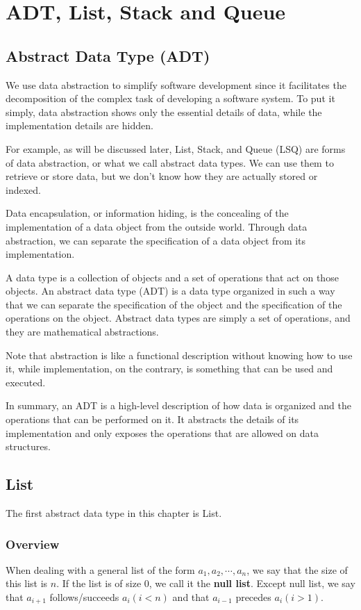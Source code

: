 \chapter{ADT, List, Stack and Queue}

\section{Abstract Data Type (ADT)}
We use data abstraction to simplify software development since it facilitates the decomposition of the complex task of developing a software system. To put it simply, data abstraction shows only the essential details of data, while the implementation details are hidden.

For example, as will be discussed later, List, Stack, and Queue (LSQ) are forms of data abstraction, or what we call abstract data types. We can use them to retrieve or store data, but we don't know how they are actually stored or indexed.

Data encapsulation, or information hiding, is the concealing of the implementation of a data object from the outside world. Through data abstraction, we can separate the specification of a data object from its implementation.

A data type is a collection of objects and a set of operations that act on those objects. An abstract data type (ADT) is a data type organized in such a way that we can separate the specification of the object and the specification of the operations on the object. Abstract data types are simply a set of operations, and they are mathematical abstractions.

Note that abstraction is like a functional description without knowing how to use it, while implementation, on the contrary, is something that can be used and executed.

In summary, an ADT is a high-level description of how data is organized and the operations that can be performed on it. It abstracts the details of its implementation and only exposes the operations that are allowed on data structures.

\section{List}
The first abstract data type in this chapter is List.

\subsection{Overview}
When dealing with a general list of the form \(a_1, a_2, \cdots, a_n\), we say that the size of this list is \(n\). If the list is of size 0, we call it the \textbf{null list}. Except null list, we say that \(a_{i+1}\) follows/succeeds \(a_i (i < n)\) and that \(a_{i-1}\) precedes \(a_i (i > 1)\). 

